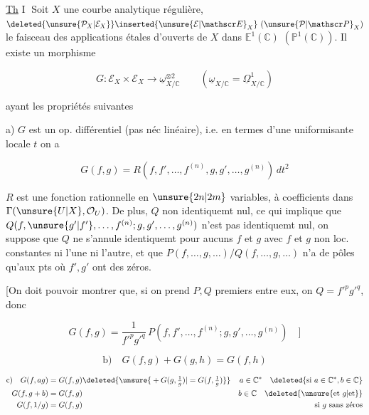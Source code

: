 
\uline{Th} \textcircled{I} Soit $X$ une courbe analytique régulière, $\deleted{\unsure{\mathcal P_X|\mathcal E_X}}\inserted{\unsure{\mathcal E|\mathscr E}_X}\ (\unsure{\mathcal P|\mathscr P}_X)$ le faisceau des applications étales d'ouverts de $X$ dans $\mathbb E^1(\mathbb C)$ $(\mathbb P^1(\mathbb C))$. Il existe un morphisme

\[
G:\mathcal E_X\times\mathcal E_X\longrightarrow\underline\omega_{X/\mathbb C}^{\otimes2}
\qquad(\underline\omega_{X/\mathbb C}=\underline\Omega^1_{X/\mathbb C})
\]

ayant les propriétés suivantes

a) $G$ est un op. différentiel (pas néc linéaire), i.e. en termes d'une uniformisante locale $t$  on a

\[
G(f,g)=R(f,f',\ldots,f^{(n)},g,g',\ldots,g^{(n)})\,dt^2
\]

$R$ est une fonction rationnelle en $\unsure{2n|2m}$ variables, à coefficients dans $\Gamma(\unsure{U|X},\mathcal O_U)$. De plus,   $Q$ non identiquemt nul,  ce qui implique  que $Q(f,\unsure{g'|f'},\ldots,f^{(n)};g,g',\ldots,g^{(n)})$ n'est pas identiquemt nul,   on suppose que $Q$ ne s'annule identiquemt pour aucuns $f$ et $g$ avec $f$ et $g$ non loc. constantes ni l'une ni l'autre, et que $P(f,\ldots,g,\ldots)/Q(f,\ldots,g,\ldots)$ n'a  de pôles qu'aux pts où $f',g'$ ont des zéros.

[On doit pouvoir montrer que, si on prend $P,Q$ premiers entre eux, on   $Q={f'}^{p}{g'}^{q}$, donc

\[
G(f,g)=\frac{1}{{f'}^{p}{g'}^{q}}\,P(f,f',\ldots,f^{(n)};g,g',\ldots,g^{(n)})\quad]
\]

\[
\text{b)}\quad G(f,g)+G(g,h)=G(f,h)
\]

\[
\begin{aligned}
\text{c)}\quad G(f,ag)&=G(f,g)\deleted{\unsure{{}+G(g,\tfrac1g)|{}=G(f,\tfrac1g)}}&
 a\in\mathbb C^*\quad\deleted{\text{si }a\in\mathbb C^*,b\in\mathbb C}\\
G(f,g+b)&=G(f,g)& b\in\mathbb C\quad\deleted{\unsure{\text{et }g|\text{et}}}\\
G(f,1/g)&=G(f,g)&\text{si $g$ sans zéros}
\end{aligned}
\]

